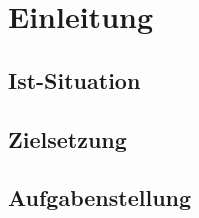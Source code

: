 \chapter{Einleitung}
\section{Ist-Situation}
\section{Zielsetzung}
\section{Aufgabenstellung}
\begin{comment}
\section{Initial Situation}
Common word processors do not prepare print-like documents in so far as these programs do not reflect the rules of professional printing which have been grown over centuries. These rules contain clear requirements for balancing page layouts, the amount of white space on pages, font-handling, etc. Donald Knuth's TeX package (see~\cite{knuth_texbook_1984}) is a word processor which conforms to these printing rules. This package was enhanced by Leslie Lamport by providing more text structuring commands. He called his package LaTeX~\cite{lamport_latex_1985}.

When preparing a thesis, we want not only to have our content on a top level, we also want to commit to a high level of formal criteria. Therefore, we request our students to use one of these professional printing production environments like TeX or LaTeX.

Furthermore students should train their scientific writing skills. This includes a clear and structured break-down of their ideas, a high-level and clear wording, and the training of transparent citations of ideas from other sources than from theirs. A good source for more information concerning technical and scientific writing can be found in~\cite{rechenberg_technisches_2006}.

\section{Goals}
The general goals and objectives of the project are described here. Care must be taken that the goals documented here are purely project goals and have nothing to do with individual goals of the team members. If individual goals should be part of the thesis they are listed in appendix~\ref{cha:individual-goals}.


\end{comment}
